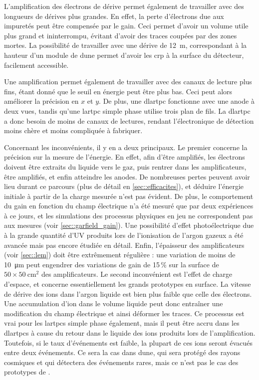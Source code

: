       L'amplification des électrons de dérive permet également de travailler avec des longueurs de dérives plus grandes. En effet, la perte d'électrons due aux impuretés peut être compensée par le gain. Ceci permet d'avoir un volume utile plus grand et ininterrompu, évitant d'avoir des traces coupées par des zones mortes. La possibilité de travailler avec une dérive de \SI{12}{\meter}, correspondant à la hauteur d'un module de \gls{dune} permet d'avoir les \gls{crp} à la surface du détecteur, facilement accessible.

      Une amplification permet également de travailler avec des canaux de lecture plus fins, étant donné que le seuil en énergie peut être plus bas. Ceci peut alors améliorer la précision en $x$ et $y$. De plus, une \gls{dlartpc} fonctionne avec une anode à deux vues, tandis qu'une \gls{lartpc} simple phase utilise trois plan de fils. La \gls{dlartpc} a donc besoin de moins de canaux de lectures, rendant l'électronique de détection moins chère et moins compliquée à fabriquer.

      Concernant les inconvénients, il y en a deux principaux. Le premier concerne la précision sur la mesure de l'énergie. En effet, afin d'être amplifiés, les électrons doivent être extraits du liquide vers le gaz, puis rentrer dans les amplificateurs, être amplifiés, et enfin atteindre les anodes. De nombreuses pertes peuvent avoir lieu durant ce parcours (plus de détail en \autoref{sec::efficacites}), et déduire l'énergie initiale à partir de la charge mesurée n'est pas évident. De plus, le comportement du gain en fonction du champ électrique n'a été mesuré que par deux expériences à ce jours, et les simulations des processus physiques en jeu ne correspondent pas aux mesures (voir \autoref{sec::garfield_gain}). Une possibilité d'effet photoélectrique due à la grande quantité d'UV produits lors de l'ionisation de l'argon gazeux a été avancée mais pas encore étudiée en détail. Enfin, l'épaisseur des amplificateurs (voir \autoref{sec::lem}) doit être extrêmement régulière : une variation de moins de \SI{10}{\micro\meter} peut engendrer des variations de gain de 15\,\% sur la surface de $50\times\SI{50}{\centi\meter\squared}$ des amplificateurs. Le second inconvénient est l'effet de charge d'espace, et concerne essentiellement les grands prototypes en surface. La vitesse de dérive des ions dans l'argon liquide est bien plus faible que celle des électrons. Une accumulation d'ion dans le volume liquide peut donc entraîner une modification du champ électrique et ainsi déformer les traces. Ce processus est vrai pour les \glspl{lartpc} simple phase également, mais il peut être accru dans les \glspl{dlartpc} à cause du retour dans le liquide des ions produits lors de l'amplification\cite{Romero2016}. Toutefois, si le taux d'événements est faible, la plupart de ces ions seront évacués entre deux événements. Ce sera la cas dans \gls{dune}, qui sera protégé des rayons cosmiques et qui détectera des événements rares, mais ce n'est pas le cas des prototypes de \protodp{}.


